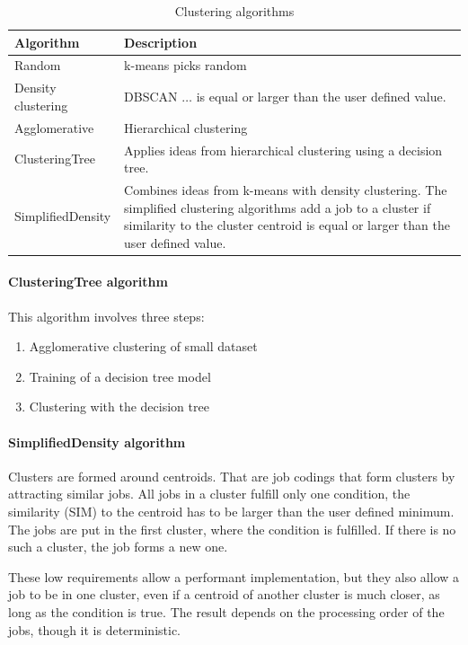 \documentclass[]{llncs}
\begin{document}
\begin{table}
  \centering
  \begin{tabularx}{\textwidth}{lX}
    Algorithm & Description \\
    \hline
    Random & k-means picks random \\
    \hline
    Density clustering &  DBSCAN $ \ldots $  is equal or larger than the user defined value. \\
    \hline
    Agglomerative &  Hierarchical clustering \\
    \hline
    ClusteringTree &  Applies ideas from hierarchical clustering using a decision tree. \\
    \hline
    SimplifiedDensity &  Combines ideas from k-means with density clustering. The simplified clustering algorithms add a job to a cluster if similarity to the cluster centroid is equal or larger than the user defined value. \\
    \hline
  \end{tabularx}
  \caption{Clustering algorithms}
  \label{tab:clustering_algorithms}
\end{table}
\paragraph{ClusteringTree algorithm}
This algorithm involves three steps:

\begin{enumerate}
 \item Agglomerative clustering of small dataset
 \item Training of a decision tree model
 \item Clustering with the decision tree
\end{enumerate}

\paragraph{SimplifiedDensity algorithm}
Clusters are formed around centroids.
That are job codings that form clusters by attracting similar jobs.
All jobs in a cluster fulfill only one condition, the similarity (SIM) to the centroid has to be larger than the user defined minimum.
The jobs are put in the first cluster, where the condition is fulfilled.
If there is no such a cluster, the job forms a new one.

These low requirements allow a performant implementation, but they also allow a job to be in one cluster, even if a centroid of another cluster is much closer, as long as the condition is true.
The result depends on the processing order of the jobs, though it is deterministic.
\end{document}
